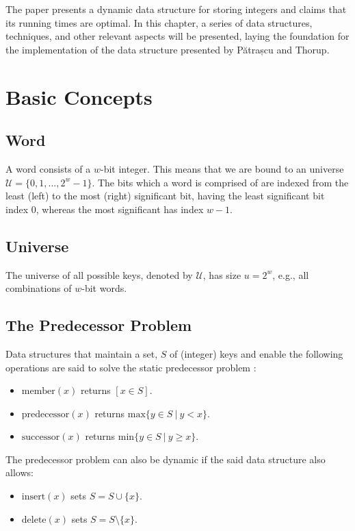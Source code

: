 The \cite{patrascu2014dynamic} paper presents a dynamic data structure for storing integers and claims that its running times are optimal.
In this chapter, a series of data structures, techniques, and other relevant aspects will be presented, laying the foundation for the implementation of the data structure presented by Pătrașcu and Thorup.

\section{Basic Concepts}

\subsection{Word}
A word consists of a $w$-bit integer. This means that we are bound to an universe $\mathcal U = \{0, 1, ..., 2^{w}-1\}$. The bits which a word is comprised of are indexed from the least (left) to the most (right) significant bit, having the least significant bit index $0$, whereas the most significant has index $w-1$.

\subsection{Universe}
The universe of all possible keys, denoted by $\mathcal U$, has size $u = 2^{w}$, e.g., all combinations of $w$-bit words.

\subsection{The Predecessor Problem}\label{sec:predecessorProblem}
Data structures that maintain a set, $S$ of (integer) keys and enable the following operations are said to solve the static predecessor problem \cite{beame1999optimal}:
\begin{itemize}
    \item
    $\text{member}(x)$ returns $[x \in S]$.
    \item
    $\text{predecessor}(x)$ returns $\text{max}\{y\in S\ |\ y < x\}$.
    \item
    $\text{successor}(x)$ returns $\text{min}\{y\in S\ |\ y \geq x\}$.
\end{itemize}

The predecessor problem can also be dynamic \cite{beame1999optimal} if the said data structure also allows:
\begin{itemize}
    \item
    $\text{insert}(x)$ sets $S=S \cup \{x\}$.
    \item
    $\text{delete}(x)$ sets $S=S \setminus \{x\}$.
\end{itemize}

